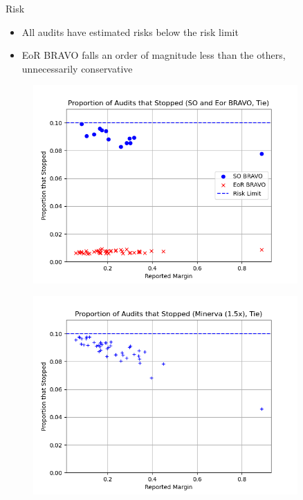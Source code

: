 \documentclass[final]{beamer}
\newcommand{\BRAVO}{\textsc{BRAVO}\xspace}
\newlength{\sepwidth}
\newlength{\colwidth}
\newcommand{\separatorcolumn}{\begin{column}{\sepwidth}\end{column}}
\begin{document}
\begin{frame}[t]
\begin{columns}[t]
\begin{column}{\colwidth}
\end{column}

\separatorcolumn

\begin{column}{\colwidth}

\begin{block}{Risk}

\begin{itemize}
\item 
All audits have estimated risks below the risk limit
\item
EoR \BRAVO falls an order of magnitude less than the others, unnecessarily conservative
\end{itemize}

\begin{figure}[h]
\centering
\begin{minipage}{.49\textwidth}
\includegraphics[width=\textwidth]{bravo_risks.png}
\label{fig:bravo_risk}
\end{minipage}
\begin{minipage}{.49\textwidth}
\includegraphics[width=1.0\textwidth]{riskminerva1p5_10t4.png}

\end{minipage}
\end{figure}
\end{block}
\end{column}
\end{columns}
\end{frame}
\end{document}
